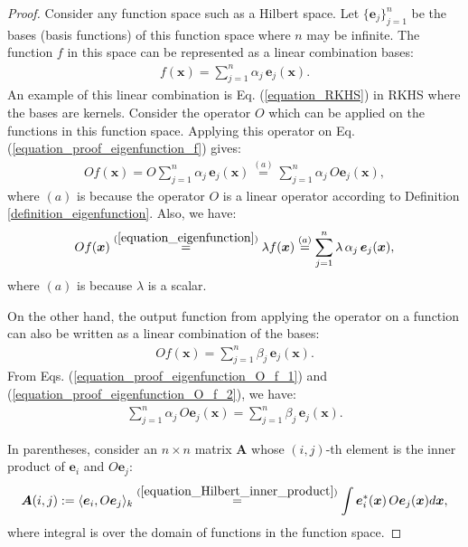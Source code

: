 \documentclass[lang=cn,10pt]{gorgeousnbook}
\numberwithin{equation}{section}%
\numberwithin{figure}{section}%
\begin{document}
\begin{proof}
Consider any function space such as a Hilbert space. Let $\{\boldsymbol{e}_j\}_{j=1}^n$ be the bases (basis functions) of this function space where $n$ may be infinite. The function $f$ in this space can be represented as a linear combination bases:
\begin{align}\label{equation_proof_eigenfunction_f}
f(\boldsymbol{x}) = \sum_{j=1}^n \alpha_j\, \boldsymbol{e}_j(\boldsymbol{x}).
\end{align}
An example of this linear combination is Eq. (\ref{equation_RKHS}) in RKHS where the bases are kernels. 
Consider the operator $O$ which can be applied on the functions in this function space.
Applying this operator on Eq. (\ref{equation_proof_eigenfunction_f}) gives:
\begin{align}\label{equation_proof_eigenfunction_O_f_1}
O f(\boldsymbol{x}) = O\sum_{j=1}^n \alpha_j\, \boldsymbol{e}_j(\boldsymbol{x}) \overset{(a)}{=} \sum_{j=1}^n \alpha_j\, O\boldsymbol{e}_j(\boldsymbol{x}),
\end{align}
where $(a)$ is because the operator $O$ is a linear operator according to Definition \ref{definition_eigenfunction}.
Also, we have: 
\begin{align}\label{equation_proof_eigenfunction_lambda_f}
O f(\boldsymbol{x}) \overset{(\ref{equation_eigenfunction})}{=} \lambda f(\boldsymbol{x}) \overset{(a)}{=} \sum_{j=1}^n \lambda\, \alpha_j\, \boldsymbol{e}_j(\boldsymbol{x}),
\end{align}
where $(a)$ is because $\lambda$ is a scalar. 

On the other hand, the output function from applying the operator on a function can also be written as a linear combination of the bases:
\begin{align}\label{equation_proof_eigenfunction_O_f_2}
O f(\boldsymbol{x}) = \sum_{j=1}^n \beta_j\, \boldsymbol{e}_j(\boldsymbol{x}).
\end{align}
From Eqs. (\ref{equation_proof_eigenfunction_O_f_1}) and (\ref{equation_proof_eigenfunction_O_f_2}), we have:
\begin{align}\label{equation_proof_eigenfunction_O_f_3}
\sum_{j=1}^n \alpha_j\, O\boldsymbol{e}_j(\boldsymbol{x}) = \sum_{j=1}^n \beta_j\, \boldsymbol{e}_j(\boldsymbol{x}).
\end{align}

In parentheses, consider an $n \times n$ matrix $\boldsymbol{A}$ whose $(i,j)$-th element is the inner product of $\boldsymbol{e}_i$ and $O \boldsymbol{e}_j$:
\begin{align}\label{equation_proof_eigenfunction_A}
\boldsymbol{A}(i,j) := \langle \boldsymbol{e}_i, O\boldsymbol{e}_j \rangle_k \overset{(\ref{equation_Hilbert_inner_product})}{=} \int \boldsymbol{e}_i^*(\boldsymbol{x})\, O\boldsymbol{e}_j(\boldsymbol{x}) d\boldsymbol{x},
\end{align}
where integral is over the domain of functions in the function space. 


\end{proof}
\end{document}
